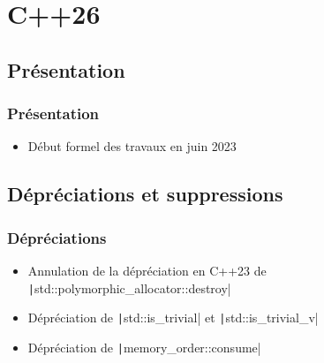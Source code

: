 \documentclass[C++.tex]{subfiles}
\begin{document}
\section{C++26}
\subsection*{Présentation}
\begin{frame}
	\frametitle{Présentation}
	\begin{itemize}
		\item Début formel des travaux en juin 2023
	\end{itemize}
\end{frame}

\subsection*{Dépréciations et suppressions}
\begin{frame}[fragile]
	\frametitle{Dépréciations}
	\begin{itemize}
		\item Annulation de la dépréciation en C++23 de \texttt|std::polymorphic_allocator::destroy|
		\item Dépréciation de \texttt|std::is_trivial| et \texttt|std::is_trivial_v|
		\item Dépréciation de \texttt|memory_order::consume|
	\end{itemize}

\end{frame}
\end{document}

